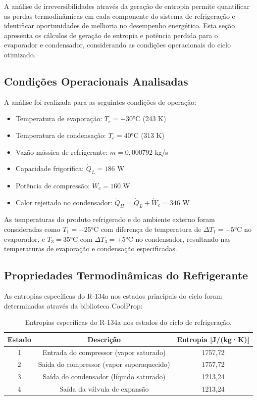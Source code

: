 A análise de irreversibilidades através da geração de entropia permite quantificar as perdas termodinâmicas em cada componente do sistema de refrigeração e identificar oportunidades de melhoria no desempenho energético. Esta seção apresenta os cálculos de geração de entropia e potência perdida para o evaporador e condensador, considerando as condições operacionais do ciclo otimizado.

\subsection{Condições Operacionais Analisadas}

A análise foi realizada para as seguintes condições de operação:

\begin{itemize}
    \item Temperatura de evaporação: $T_e = -30$°C (243 K)
    \item Temperatura de condensação: $T_c = 40$°C (313 K)
    \item Vazão mássica de refrigerante: $\dot{m} = 0{,}000792$ kg/s
    \item Capacidade frigorífica: $\dot{Q}_L = 186$ W
    \item Potência de compressão: $\dot{W}_c = 160$ W
    \item Calor rejeitado no condensador: $\dot{Q}_H = \dot{Q}_L + \dot{W}_c = 346$ W
\end{itemize}

As temperaturas do produto refrigerado e do ambiente externo foram consideradas como $T_1 = -25$°C com diferença de temperatura de $\Delta T_1 = -5$°C no evaporador, e $T_3 = 35$°C com $\Delta T_3 = +5$°C no condensador, resultando nas temperaturas de evaporação e condensação especificadas.

\subsection{Propriedades Termodinâmicas do Refrigerante}

As entropias específicas do R-134a nos estados principais do ciclo foram determinadas através da biblioteca CoolProp:

\begin{table}[ht]
\centering
\begin{tabular}{|c|c|c|}
\hline
\textbf{Estado} & \textbf{Descrição} & \textbf{Entropia [J/(kg·K)]} \\ \hline
1 & Entrada do compressor (vapor saturado) & 1757,72 \\ \hline
2 & Saída do compressor (vapor superaquecido) & 1757,72 \\ \hline
3 & Saída do condensador (líquido saturado) & 1213,24 \\ \hline
4 & Saída da válvula de expansão & 1213,24 \\ \hline
\end{tabular}
\caption{Entropias específicas do R-134a nos estados do ciclo de refrigeração.}
\label{tab:entropias}
\end{table}

